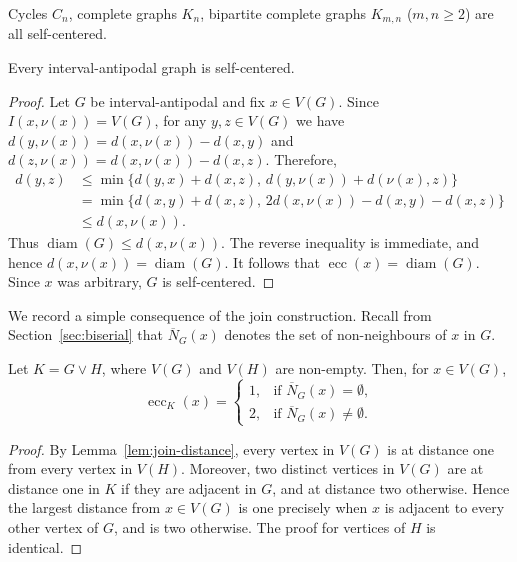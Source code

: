 \documentclass[a4paper,leqno]{amsart}
\begin{document}
\begin{eg}\label{eg:self-centered eg}
Cycles $C_n$, complete graphs $K_n$, bipartite complete graphs $K_{m,n}$ ($m,n\geq 2$) are all self-centered. 
\end{eg}

\begin{prop}
Every interval-antipodal graph is self-centered.
\end{prop}
\begin{proof}
Let $G$ be interval-antipodal and fix $x\in V(G)$. Since $I(x,\nu(x))=V(G)$,
for any $y,z\in V(G)$ we have $d(y,\nu(x))=d(x,\nu(x))-d(x,y)$ and $d(z,\nu(x))=d(x,\nu(x))-d(x,z)$. Therefore,
\begin{align*}
d(y,z)
&\leq \min\bigl\{
d(y,x)+d(x,z),\,
d(y,\nu(x))+d(\nu(x),z)
\bigr\}\\
&=\min\bigl\{
d(x,y)+d(x,z),\,
2d(x,\nu(x))-d(x,y)-d(x,z)
\bigr\}\\
&\leq d(x,\nu(x)).
\end{align*}
Thus $\operatorname{diam}(G)\leq d(x,\nu(x))$. The reverse inequality is immediate, and hence $d(x,\nu(x))=\operatorname{diam}(G)$. It follows that $\operatorname{ecc}(x)=\operatorname{diam}(G)$. Since $x$ was arbitrary, $G$ is self-centered.
\end{proof}

We record a simple consequence of the join construction. Recall from Section~\ref{sec:biserial} that $\overline N_G(x)$ denotes the set of non-neighbours of $x$ in $G$.

\begin{lem}\label{lem:join-eccentricity}
Let $K=G\vee H$, where $V(G)$ and $V(H)$ are non-empty. Then, for
$x\in V(G)$,
$$\operatorname{ecc}_K(x)=
\begin{cases}
1, & \text{if } \overline N_G(x)=\emptyset,\\
2, & \text{if } \overline N_G(x)\neq\emptyset.
\end{cases}
$$
\end{lem}

\begin{proof}
By Lemma~\ref{lem:join-distance}, every vertex in $V(G)$ is at distance
one from every vertex in $V(H)$. Moreover, two distinct vertices in $V(G)$ are at distance one in $K$ if they are adjacent in $G$, and at distance two otherwise. Hence the largest distance from $x\in V(G)$ is one precisely when $x$ is adjacent to every other vertex of $G$, and is two otherwise. The proof for vertices of $H$ is identical.
\end{proof}
\end{document}
